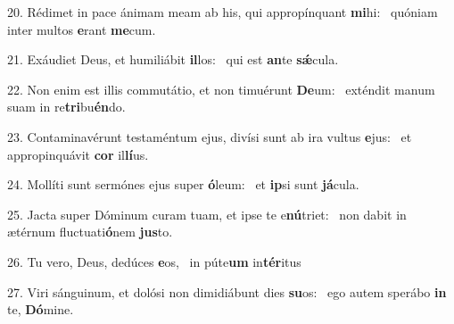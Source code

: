 20. Rédimet in pace ánimam meam ab his, qui appropínquant \textbf{mi}hi: \ast\  quóniam inter multos \textbf{e}rant \textbf{me}cum.\

21. Exáudiet Deus, et humiliábit \textbf{il}los: \ast\  qui est \textbf{an}te \textbf{sǽ}cula.\

22. Non enim est illis commutátio, et non timuérunt \textbf{De}um: \ast\  exténdit manum suam in re\textbf{tri}bu\textbf{én}do.\

23. Contaminavérunt testaméntum ejus, divísi sunt ab ira vultus \textbf{e}jus: \ast\  et appropinquávit \textbf{cor} il\textbf{lí}us.\

24. Mollíti sunt sermónes ejus super \textbf{ó}leum: \ast\  et \textbf{ip}si sunt \textbf{já}cula.\

25. Jacta super Dóminum curam tuam, et ipse te e\textbf{nú}triet: \ast\  non dabit in ætérnum fluctuati\textbf{ó}nem \textbf{jus}to.\

26. Tu vero, Deus, dedúces \textbf{e}os, \ast\  in púte\textbf{um} in\textbf{tér}itus\

27. Viri sánguinum, et dolósi non dimidiábunt dies \textbf{su}os: \ast\  ego autem sperábo \textbf{in} te, \textbf{Dó}mine.\

